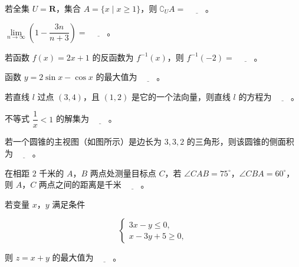 \begin{question}
若全集 $U=\mathbf R$，集合 $A=\{x\mid x\geqslant 1\}$，则 $\complement_U A=$ $\underline{\qquad}$。

\end{question}
\begin{question}
$\lim\limits_{n\to\infty}\left(1-\dfrac{3n}{n+3}\right)=$ $\underline{\qquad}$。

\end{question}
\begin{question}
若函数 $f(x)=2x+1$ 的反函数为 $f^{-1}(x)$，则 $f^{-1}(-2)=$ $\underline{\qquad}$。

\end{question}
\begin{question}
函数 $y=2\sin x-\cos x$ 的最大值为 $\underline{\qquad}$。

\end{question}
\begin{question}
若直线 $l$ 过点 $(3,4)$，且 $(1,2)$ 是它的一个法向量，则直线 $l$ 的方程为 $\underline{\qquad}$。

\end{question}
\begin{question}
不等式 $\dfrac1x<1$ 的解集为 $\underline{\qquad}$。

\Needspace{0.4\textheight}
\end{question}
\begingroup
\renewenvironment{question}{\Needspace{0.4\textheight}}{}
\begin{question}
若一个圆锥的主视图（如图所示）是边长为 $3,3,2$ 的三角形，则该圆锥的侧面积为 $\underline{\qquad}$。
\nopagebreak[4]
\begin{center}\end{center}
\nopagebreak[4]
\end{question}
\endgroup
\begin{question}
在相距 $2$ 千米的 $A$，$B$ 两点处测量目标点 $C$，若 $\angle CAB=75^\circ$，$\angle CBA=60^\circ$，则 $A$，$C$ 两点之间的距离是千米 $\underline{\qquad}$。

\end{question}
\begin{question}
若变量 $x$，$y$ 满足条件

\nopagebreak[4]
\[
\begin{cases}
3x-y\leqslant 0,\\
x-3y+5\geqslant 0,
\end{cases}
\]

则 $z=x+y$ 的最大值为 $\underline{\qquad}$。

\end{question}
